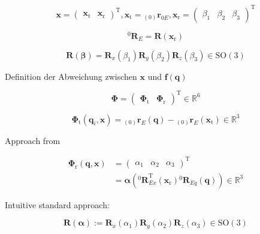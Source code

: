 \documentclass[twocolumn,10pt]{IFTOMM}
\newcommand{\bm}[1]{\boldsymbol{#1}}
\newcommand{\ortvek}[4]{{ }_{(#1)}{\boldsymbol{#2}}^{#3}_{#4} }
\newcommand{\rotmat}[2]{{{ }^{#1}\boldsymbol{R}}_{#2}}
\newcommand{\transp}[0]{{\mathrm{T}}}
\begin{document}
\begin{equation}
\bm{x}
=
\begin{pmatrix}
\bm{x}_{\mathrm{t}} & \bm{x}_{\mathrm{r}}
\end{pmatrix}^\transp
, 
\bm{x}_{\mathrm{t}}
=
\ortvek{0}{r}{}{0E}
,
\bm{x}_{\mathrm{r}}
=
\begin{pmatrix}
\beta_1  & \beta_2 & \beta_3
\end{pmatrix}^{\mathrm{T}}
\end{equation}  


\begin{equation}
\rotmat{0}{E}=\bm{R}(\bm{x}_{\mathrm{r}})
\end{equation}  


\begin{equation}
\bm{R}(\bm{\beta}) = \bm{R}_x(\beta_1) \bm{R}_y(\beta_2) \bm{R}_z(\beta_3) \in \mathrm{SO(3)}
\label{equ:def_rmat_xyz}
\end{equation}

Definition der Abweichung zwischen $\bm{x}$ und $\bm{f}(\bm{q})$

\begin{equation}
\bm{\Phi}=\begin{pmatrix}
\bm{\Phi}_{\mathrm{t}} & \bm{\Phi}_{\mathrm{r}}
\end{pmatrix}^\transp \in {\mathbb{R}}^{6}
\end{equation}

\begin{equation}
\bm{\Phi}_{\mathrm{t}}(\bm{q}_i,\bm{x}) = \ortvek{0}{r}{}{E}(\bm{q}) - \ortvek{0}{r}{}{E}(\bm{x}_{\mathrm{t}}) \in {\mathbb{R}}^{3}
\end{equation}

Approach from \cite{GoldenbergBenFen1985}

\begin{align}
\bm{\Phi}_{\mathrm{r}}(\bm{q},\bm{x}) &= \begin{pmatrix}
\alpha_1  & \alpha_2 & \alpha_3
\end{pmatrix}^\transp  \\
&=\bm{\alpha}\left(\rotmat{0}{Ex}^\transp (\bm{x}_{\mathrm{r}})\rotmat{0}{Eq}(\bm{q})\right) \in {\mathbb{R}}^{3}
\end{align}


Intuitive standard approach:

\begin{equation}
\bm{R}(\bm{\alpha}) := \bm{R}_x(\alpha_1) \bm{R}_y(\alpha_2) \bm{R}_z(\alpha_3) \in \mathrm{SO(3)}
\end{equation}
\end{document}
